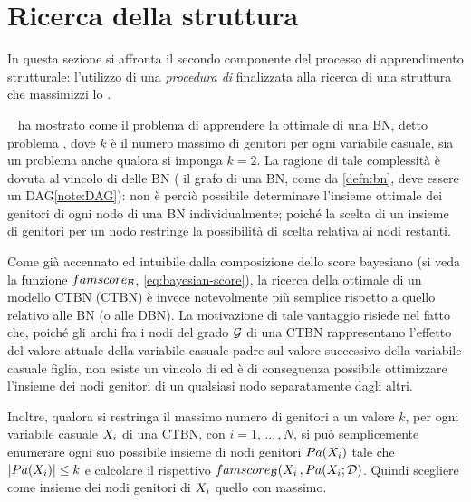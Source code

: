 \section{Ricerca della struttura}\label{sec:structurallearning-search}
In questa sezione si affronta il secondo componente del processo di apprendimento strutturale: l'utilizzo di una \emph{procedura di } finalizzata alla ricerca di una struttura che massimizzi lo \emph{}.

~\citet{Chickering1994} ha mostrato come il problema di apprendere la  ottimale di una \acl{BN}, detto problema \emph{}, dove $k$ è il numero massimo di genitori per ogni variabile casuale, sia un problema \emph{} anche qualora si imponga $k=2$. La ragione di tale complessità è dovuta al vincolo di  delle \acs{BN} (\ie{} il grafo di una \acs{BN}, come da \autoref{defn:bn}, deve essere un \acs{DAG}\cref{note:DAG}): non è perciò possibile determinare l'insieme ottimale dei genitori di ogni nodo di una \acs{BN} individualmente; poiché la scelta di un insieme di genitori per un nodo restringe la possibilità di scelta relativa ai nodi restanti.

Come già accennato ed intuibile dalla composizione dello score bayesiano (si veda la funzione $famscore_{\mathcal{B}}$, \autoref{eq:bayesian-score}), la ricerca della  ottimale di un modello \acl{CTBN} (\acs{CTBN}) è invece notevolmente più semplice rispetto a quello relativo alle \acs{BN} (o alle \acs{DBN}). La motivazione di tale vantaggio risiede nel fatto che, poiché gli archi fra i nodi del grado $\mathcal{G}$ di una \acs{CTBN} rappresentano l'effetto del valore attuale della variabile casuale padre sul valore successivo della variabile casuale figlia, non esiste un vincolo di  ed è di conseguenza possibile ottimizzare l'insieme dei nodi genitori di un qualsiasi nodo separatamente dagli altri.

Inoltre, qualora si restringa il massimo numero di genitori a un valore $k$, per ogni variabile casuale $\mathnormal{X}_i$ di una \acs{CTBN}, con $i=1,\,\dotsc\,,N$, si può semplicemente enumerare ogni suo possibile insieme di nodi genitori $Pa(\mathnormal{X}_i)$ tale che $\arrowvert Pa(\mathnormal{X}_i) \arrowvert \leq k$ e calcolare il rispettivo  $famscore_{\mathcal{B}}(\mathnormal{X}_i\,,Pa(\mathnormal{X}_i;\mathcal{D})$. Quindi scegliere come insieme dei nodi genitori di $\mathnormal{X}_i$ quello con  massimo.

